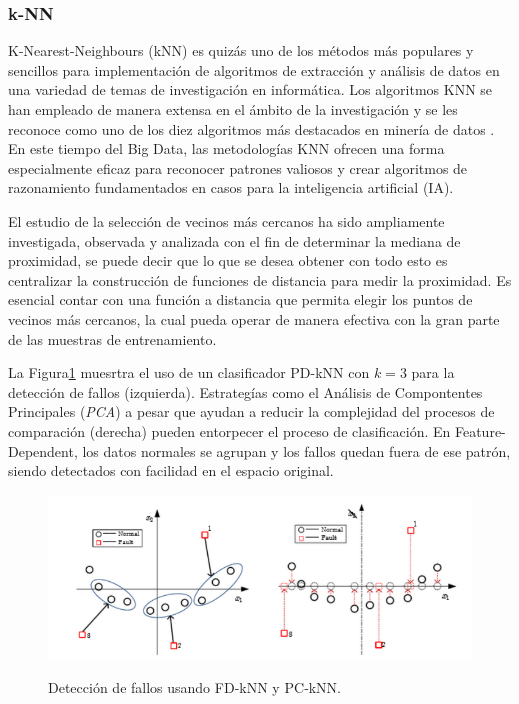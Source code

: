 \documentclass[11pt,a4paper,spanish]{book}
\numberwithin{equation}{chapter}
\numberwithin{figure}{chapter}
\begin{document}
\subsubsection{k-NN}


K-Nearest-Neighbours (kNN) es quizás uno de los métodos más populares y sencillos para 
implementación de algoritmos de extracción y análisis de datos en una variedad de temas 
de investigación en informática. Los algoritmos KNN se han empleado de manera extensa 
en el ámbito de la investigación y se les reconoce como uno de los diez algoritmos más 
destacados en minería de datos \cite{witten2005data}. En este tiempo del Big Data, 
las metodologías KNN ofrecen una forma especialmente eficaz para reconocer patrones 
valiosos y crear algoritmos de razonamiento fundamentados en casos para la inteligencia 
artificial (IA). \cite{wu2008top}


El estudio de la selección de vecinos más cercanos ha sido ampliamente investigada, 
observada y analizada con el fin de determinar la mediana de proximidad, se puede decir 
que lo que se desea obtener con todo esto es centralizar la construcción de funciones de 
distancia para medir la proximidad. Es esencial contar con una función a distancia que 
permita elegir los puntos de vecinos más cercanos, la cual pueda operar de manera 
efectiva con la gran parte de las muestras de entrenamiento. \cite{zhang2022influence}


La Figura\ref{fig:figKnnZhou} muesrtra el uso de un clasificador PD-kNN con $k=3$ para 
la detección de fallos (izquierda). 
Estrategías como el Análisis de Compontentes Principales (\textit{PCA}) a pesar que ayudan a
reducir la complejidad del procesos de comparación (derecha) 
pueden entorpecer el proceso de clasificación. En Feature-Dependent, los datos normales 
se agrupan y los fallos quedan fuera de ese patrón, 
siendo detectados con facilidad en el espacio original.


\begin{figure}[h]
    \caption{Detección de fallos usando FD‑kNN y PC‑kNN. \protect\cite{zhou2015faultdetection}}
    \centering
    \includegraphics[width=1.0\textwidth]{media/knn-zhou.png}
    \label{fig:figKnnZhou}
\end{figure}
\end{document}
